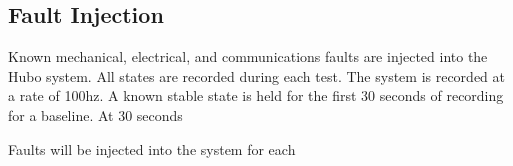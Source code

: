 \subsection{Fault Injection}
Known mechanical, electrical, and communications faults are injected into the Hubo system.  
All states are recorded during each test.  The system is recorded at a rate of 100hz.  A known
stable state is held for the first 30 seconds of recording for a baseline.  At 30 seconds


Faults will be injected into the system for each 
